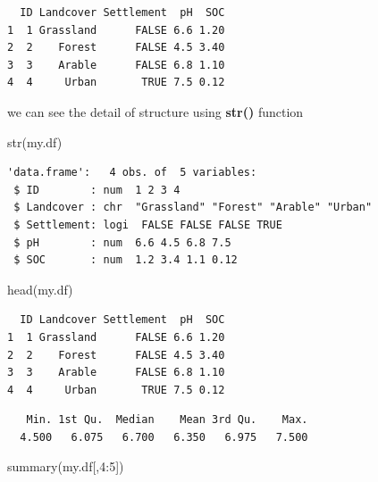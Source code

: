 \documentclass[
  letterpaper,
  DIV=11,
  numbers=noendperiod]{scrreprt}
\newenvironment{Shaded}{\begin{snugshade}}{\end{snugshade}}
\newcommand{\DecValTok}[1]{\textcolor[rgb]{0.68,0.00,0.00}{#1}}
\newcommand{\FunctionTok}[1]{\textcolor[rgb]{0.28,0.35,0.67}{#1}}
\newcommand{\NormalTok}[1]{\textcolor[rgb]{0.00,0.23,0.31}{#1}}
\newcommand{\SpecialCharTok}[1]{\textcolor[rgb]{0.37,0.37,0.37}{#1}}
\begin{document}
\begin{verbatim}
  ID Landcover Settlement  pH  SOC
1  1 Grassland      FALSE 6.6 1.20
2  2    Forest      FALSE 4.5 3.40
3  3    Arable      FALSE 6.8 1.10
4  4     Urban       TRUE 7.5 0.12
\end{verbatim}

we can see the detail of structure using \textbf{str()} function

\begin{Shaded}
\begin{Highlighting}[]
\FunctionTok{str}\NormalTok{(my.df)}
\end{Highlighting}
\end{Shaded}

\begin{verbatim}
'data.frame':   4 obs. of  5 variables:
 $ ID        : num  1 2 3 4
 $ Landcover : chr  "Grassland" "Forest" "Arable" "Urban"
 $ Settlement: logi  FALSE FALSE FALSE TRUE
 $ pH        : num  6.6 4.5 6.8 7.5
 $ SOC       : num  1.2 3.4 1.1 0.12
\end{verbatim}

\begin{Shaded}
\begin{Highlighting}[]
\FunctionTok{head}\NormalTok{(my.df)}
\end{Highlighting}
\end{Shaded}

\begin{verbatim}
  ID Landcover Settlement  pH  SOC
1  1 Grassland      FALSE 6.6 1.20
2  2    Forest      FALSE 4.5 3.40
3  3    Arable      FALSE 6.8 1.10
4  4     Urban       TRUE 7.5 0.12
\end{verbatim}

\begin{Shaded}
\end{Shaded}

\begin{verbatim}
   Min. 1st Qu.  Median    Mean 3rd Qu.    Max. 
  4.500   6.075   6.700   6.350   6.975   7.500 
\end{verbatim}

\begin{Shaded}
\begin{Highlighting}[]
\FunctionTok{summary}\NormalTok{(my.df[,}\DecValTok{4}\SpecialCharTok{:}\DecValTok{5}\NormalTok{])}
\end{Highlighting}
\end{Shaded}
\end{document}
